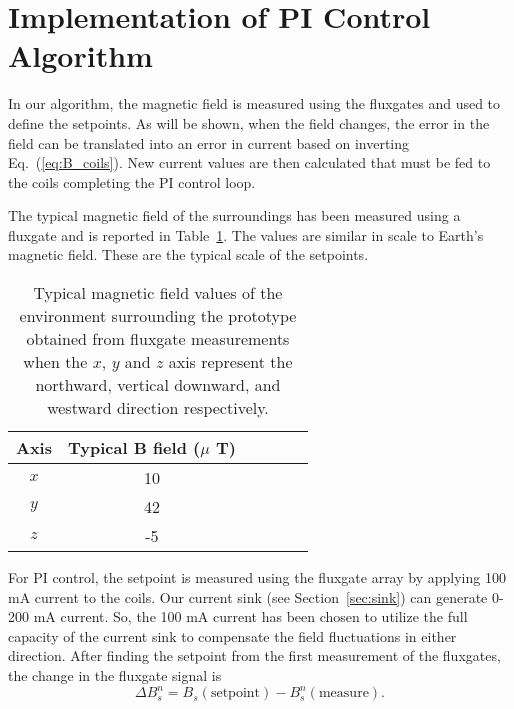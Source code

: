 \section{Implementation of PI Control Algorithm}\label{sec:pi}
 In our algorithm, the magnetic field is measured using the fluxgates and used to define the setpoints. As will be shown, when the field changes, the error in the field can be translated into an error in current based on inverting Eq.~(\ref{eq:B_coils}). New current values are then calculated that must be fed to the coils completing the PI control loop. 


The typical magnetic field of the surroundings has been measured using a fluxgate and is reported in Table~\ref{table:Benvironment}. The values are similar in scale to Earth's magnetic field. These are the typical scale of the setpoints.

\begin{table} 
    \centering
    \begin{tabular} { |c|c|c|c|c|c|} 
        \hline
        Axis & \makecell{Typical B field \\($\mu$ T)}\\
        \hline\hline
        $x$ & 10 \\ 
        \hline
        $y$ & 42 \\ 
        \hline
        $z$ & -5 \\ 
        \hline
    \end{tabular}
    \caption[Typical magnetic fields surrounding the prototype]{Typical magnetic field values of the environment surrounding the prototype obtained from fluxgate measurements when the $x$, $y$ and $z$ axis represent the northward, vertical downward, and westward direction respectively. }\label{table:Benvironment}
\end{table}

For PI control, the setpoint is measured using the fluxgate array by applying 100 mA current to the coils. Our current sink (see Section~\ref{sec:sink}) can generate 0-200 mA current. So, the 100 mA current has been chosen to utilize the full capacity of the current sink to compensate the field fluctuations in either direction. After finding the setpoint from the first measurement of the fluxgates, the change in the fluxgate signal is
\begin{equation}\label{eq:del_B}
    \Delta B_s^n = B_s(\mathrm{setpoint}) - B_s^n(\mathrm{measure})\text{.}
\end{equation}

